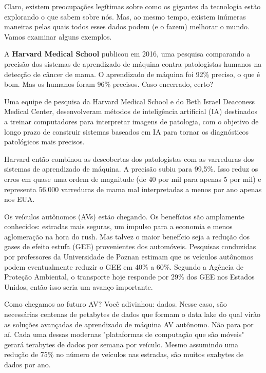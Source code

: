 Claro, existem preocupações legítimas sobre como os gigantes da tecnologia estão explorando o que sabem sobre nós. Mas, ao mesmo tempo, existem inúmeras maneiras pelas quais todos esses dados podem (e o fazem) melhorar o mundo. Vamos examinar alguns exemplos.\vskip0.3cm 


A \textbf{Harvard Medical School} publicou em 2016, uma pesquisa comparando a precisão dos sistemas de aprendizado de máquina contra patologistas humanos na detecção de câncer de mama. O aprendizado de máquina foi 92\% preciso, o que é bom. Mas os humanos foram 96\% precisos. Caso encerrado, certo?\vskip0.3cm 


Uma equipe de pesquisa da Harvard Medical School e do Beth Israel Deaconess Medical Center, desenvolveram métodos de inteligência artificial (IA) destinados a treinar computadores para interpretar imagens de patologia, com o objetivo de longo prazo de construir sistemas baseados em IA para tornar os diagnósticos patológicos mais precisos.\vskip0.3cm 



Harvard então combinou as descobertas dos patologistas com as varreduras dos sistemas de aprendizado de máquina. A precisão subiu para 99,5\%. Isso reduz os erros em quase uma ordem de magnitude (de 40 por mil para apenas 5 por mil) e representa 56.000 varreduras de mama mal interpretadas a menos por ano apenas nos EUA.\vskip0.3cm 

Os veículos autônomos (AVs) estão chegando. Os benefícios são amplamente conhecidos: estradas mais seguras, um impulso para a economia e menos aglomeração na hora do rush. Mas talvez o maior benefício seja a redução dos gases de efeito estufa (GEE) provenientes dos automóveis. Pesquisas conduzidas por professores da Universidade de Poznan estimam que os veículos autônomos podem eventualmente reduzir o GEE em 40\% a 60\%. Segundo a Agência de Proteção Ambiental, o transporte hoje responde por 29\% dos GEE nos Estados Unidos, então isso seria um avanço importante.\vskip0.3cm 

Como chegamos ao futuro AV? Você adivinhou: dados. Nesse caso, são necessárias centenas de petabytes de dados que formam o data lake do qual virão as soluções avançadas de aprendizado de máquina AV autônomo. Não para por aí. Cada uma dessas modernas "plataformas de computação que são móveis" gerará terabytes de dados por semana por veículo. Mesmo assumindo uma redução de 75\% no número de veículos nas estradas, são muitos exabytes de dados por ano.\vskip0.3cm 


